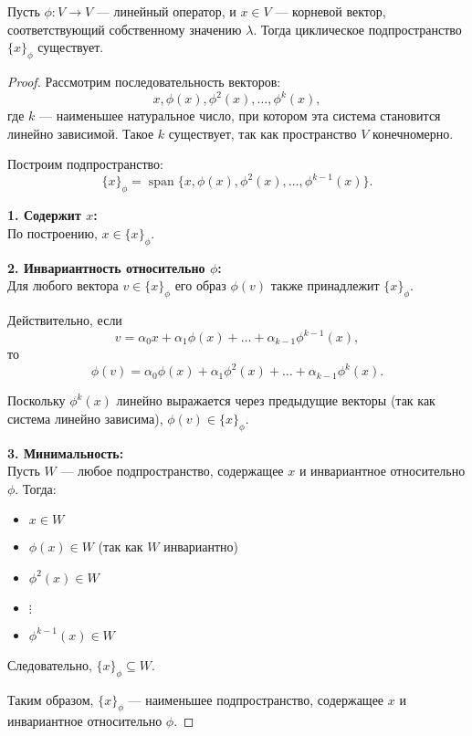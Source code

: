 \vspace{0.3cm}

\begin{shth}
    \begin{theorem}
        Пусть \(\phi: V \to V\) — линейный оператор, и \(x \in V\) — корневой вектор, соответствующий собственному значению \(\lambda\). Тогда циклическое подпространство \(\{x\}_{\phi}\) существует.
    \end{theorem}
\end{shth}

\begin{proof}
    Рассмотрим последовательность векторов:
    \[
    x, \phi(x), \phi^2(x), \dots, \phi^k(x),
    \]
    где $k$ — наименьшее натуральное число, при котором эта система становится линейно зависимой. Такое $k$ существует, так как пространство $V$ конечномерно.

    Построим подпространство:
    \[
    \{x\}_{\phi} = \operatorname{span}\{x, \phi(x), \phi^2(x), \dots, \phi^{k-1}(x)\}.
    \]

    \textbf{1. Содержит $x$:} \\
    По построению, $x \in \{x\}_{\phi}$.

    \textbf{2. Инвариантность относительно $\phi$:} \\
    Для любого вектора $v \in \{x\}_{\phi}$ его образ $\phi(v)$ также принадлежит $\{x\}_{\phi}$. 
    
    Действительно, если
    \[
    v = \alpha_0 x + \alpha_1 \phi(x) + \dots + \alpha_{k-1} \phi^{k-1}(x),
    \]
    то
    \[
    \phi(v) = \alpha_0 \phi(x) + \alpha_1 \phi^2(x) + \dots + \alpha_{k-1} \phi^k(x).
    \]
    
    Поскольку $\phi^k(x)$ линейно выражается через предыдущие векторы (так как система линейно зависима), $\phi(v) \in \{x\}_{\phi}$.

    \textbf{3. Минимальность:} \\
    
    Пусть $W$ — любое подпространство, содержащее $x$ и инвариантное относительно $\phi$. Тогда:
    \begin{itemize}
        \item $x \in W$
        \item $\phi(x) \in W$ (так как $W$ инвариантно)
        \item $\phi^2(x) \in W$
        \item $\vdots$
        \item $\phi^{k-1}(x) \in W$
    \end{itemize}
    Следовательно, $\{x\}_{\phi} \subseteq W$.

    Таким образом, $\{x\}_{\phi}$ — наименьшее подпространство, содержащее $x$ и инвариантное относительно $\phi$.
\end{proof}

